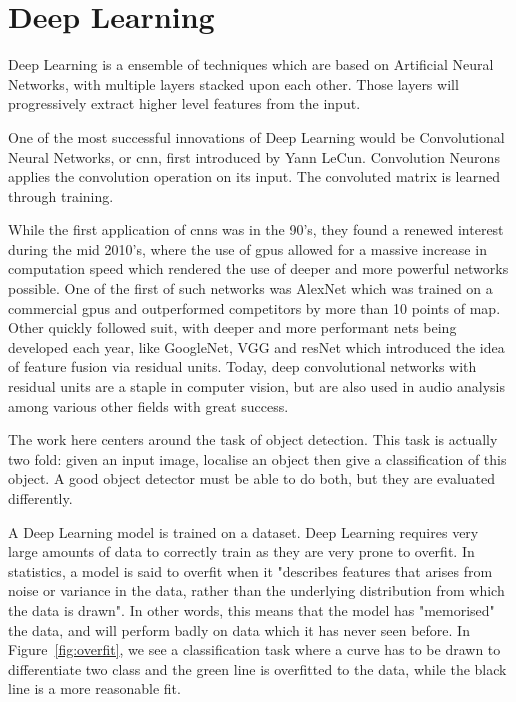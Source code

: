 \section{Deep Learning}\label{overfit}
Deep Learning is a ensemble of techniques which are based on Artificial Neural Networks, with multiple layers stacked upon each other. Those layers will progressively extract higher level features from the input. 

One of the most successful innovations of Deep Learning would be Convolutional Neural Networks, or \gls{cnn}, first introduced by Yann LeCun\cite{lecun98}. Convolution Neurons applies the convolution operation on its input. The convoluted matrix is learned through training.

While the first application of \glspl{cnn} was in the 90's, they found a renewed interest during the mid 2010's, where the use of \glspl{gpu} allowed for a massive increase in computation speed which rendered the use of deeper and more powerful networks possible. One of the first of such networks was AlexNet\cite{alexNet} which was trained on a commercial \glspl{gpu} and outperformed competitors by more than 10 points of \gls{map}. Other quickly followed suit, with deeper and more performant nets being developed each year, like GoogleNet\cite{googleNet}, VGG\cite{vgg} and resNet\cite{resNet} which introduced the idea of feature fusion via residual units. Today, deep convolutional networks with residual units are a staple in computer vision, but are also used in audio analysis\cite{PiczakCNN}\cite{Adavanne_CRNN}\cite{KaoAlRCRNN}\cite{CakirCRNN}\cite{PhanAl_CNN} among various other fields with great success.

The work here centers around the task of object detection. This task is actually two fold: given an input image, localise an object then give a classification of this object. A good object detector must be able to do both, but they are evaluated differently. 

A Deep Learning model is trained on a dataset. Deep Learning requires very large amounts of data to correctly train as they are very prone to \gls{overfit}. In statistics, a model is said to \gls{overfit} when it "describes features that arises from noise or variance in the data, rather than the underlying distribution from which the data is drawn"\cite{Webb2010}. In other words, this means that the model has "memorised" the data, and will perform badly on data which it has never seen before. In Figure~\ref{fig:overfit}, we see a classification task where a curve has to be drawn to differentiate two class and the green line is overfitted to the data, while the black line is a more reasonable fit.

